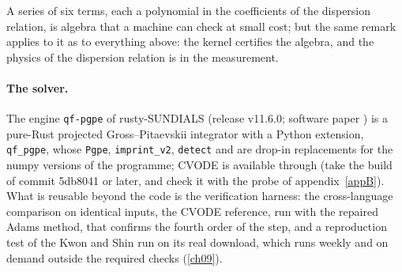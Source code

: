 A series of six terms, each a polynomial in the coefficients of the dispersion relation, is algebra that a machine can check at small cost; but the
same remark applies to it as to everything above: the kernel certifies the algebra, and the physics of the dispersion relation is in the measurement.

\paragraph{The solver.} The engine \texttt{qf-pgpe} of rusty-SUNDIALS (release v11.6.0; software paper \cite{Callens2026sw}) is a pure-Rust
projected Gross--Pitaevskii integrator with a Python extension, \texttt{qf\_pgpe}, whose \texttt{Pgpe}, \texttt{imprint\_v2}, \texttt{detect} and
 are drop-in replacements for the numpy versions of the programme; CVODE \cite{Hindmarsh2005} is available through
 (take the build of commit 5db8041 or later, and check it with the probe of appendix~\ref{appB}). What is reusable beyond the code is the
verification harness: the cross-language comparison on identical inputs, the CVODE reference, run with the repaired Adams method, that confirms the fourth order
of the step, and a reproduction test of the Kwon and Shin run \cite{KwonShin2026data} on its real download,
which runs weekly and on demand outside the required checks (\cref{ch09}).

